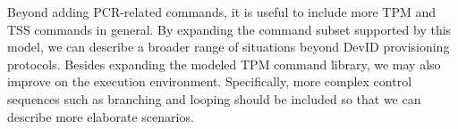 \documentclass[runningheads]{llncs}
\begin{document}
Beyond adding PCR-related commands, it is useful to include more TPM
and TSS commands in general. By expanding the command subset
supported by this model, we can describe a broader range of situations
beyond DevID provisioning protocols.  Besides expanding the modeled
TPM command library, we may also improve on the execution
environment. Specifically, more complex control sequences such as
branching and looping should be included so that we can describe more
elaborate scenarios.
%
%
%

\end{document}

